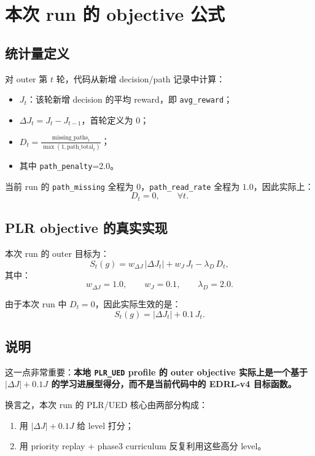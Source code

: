 \documentclass[11pt,a4paper]{ctexart}
\begin{document}
\section{本次 run 的 objective 公式}

\subsection{统计量定义}
对 outer 第 \(t\) 轮，代码从新增 decision/path 记录中计算：
\begin{itemize}[leftmargin=2.2em,itemsep=0.2em]
    \item \(J_t\)：该轮新增 decision 的平均 reward，即 \texttt{avg\_reward}；
    \item \(\Delta J_t = J_t - J_{t-1}\)，首轮定义为 \(0\)；
    \item \(D_t = \frac{\text{missing\_paths}_t}{\max(1,\text{path\_total}_t)}\)；
    \item 其中 \texttt{path\_penalty}=2.0。
\end{itemize}

当前 run 的 \texttt{path\_missing} 全程为 \(0\)，\texttt{path\_read\_rate} 全程为 \(1.0\)，因此实际上：
\[
D_t = 0,\qquad \forall t.
\]

\subsection{PLR objective 的真实实现}
本次 run 的 outer 目标为：
\begin{equation}
S_t(g)=w_{\Delta J}\,|\Delta J_t| + w_J\,J_t - \lambda_D\,D_t,
\end{equation}
其中：
\[
w_{\Delta J}=1.0,\qquad w_J=0.1,\qquad \lambda_D=2.0.
\]

由于本次 run 中 \(D_t=0\)，因此实际生效的是：
\[
S_t(g)=|\Delta J_t|+0.1\,J_t.
\]

\subsection{说明}
这一点非常重要：\textbf{本地 \texttt{PLR\_UED} profile 的 outer objective 实际上是一个基于 \(|\Delta J| + 0.1J\) 的学习进展型得分，而不是当前代码中的 EDRL-v4 目标函数。}

换言之，本次 run 的 PLR/UED 核心由两部分构成：
\begin{enumerate}[leftmargin=2.2em,itemsep=0.2em]
    \item 用 \(|\Delta J| + 0.1J\) 给 level 打分；
    \item 用 priority replay + phase3 curriculum 反复利用这些高分 level。
\end{enumerate}
\end{document}
